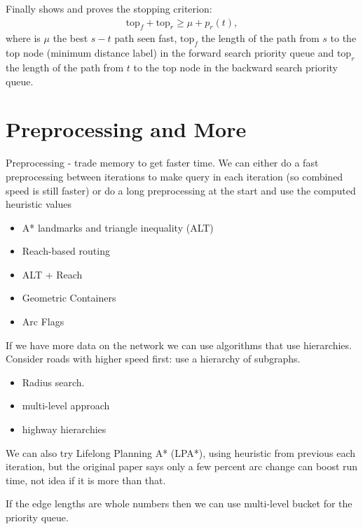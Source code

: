 Finally \citet{GoldbergEPP} shows and proves the stopping criterion:
\begin{align}
    \text{top}_f + \text{top}_r \geq \mu + p_r(t),
\end{align}
where is $\mu$ the best $s-t$ path seen fast, $\text{top}_f$ the length of the path from $s$ to the top node (minimum distance label) in the forward search priority queue and $\text{top}_r$ the length of the path from $t$ to the top node in the backward search priority queue.

\section{Preprocessing and More}
Preprocessing - trade memory to get faster time.
We can either do a fast preprocessing between iterations to make query in each iteration (so combined speed is still faster) 
or do a long preprocessing at the start and use the computed heuristic values
\begin{itemize}
    \item A* landmarks and triangle inequality (ALT)
    \item Reach-based routing 
    \item ALT + Reach
    \item Geometric Containers
    \item Arc Flags
\end{itemize}

If we have more data on the network we can use
algorithms that use hierarchies.
Consider roads with higher speed first: use a hierarchy of subgraphs.
\begin{itemize}
    \item Radius search.
    \item multi-level approach
    \item highway hierarchies
\end{itemize}


We can also try Lifelong Planning A* (LPA*), using heuristic from previous each iteration, but the original paper says only a few percent arc change can boost run time, not idea if it is more than that. 

If the edge lengths are whole numbers then we can use multi-level bucket for the priority queue.

